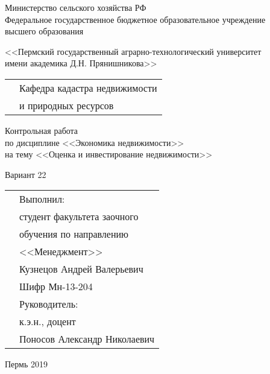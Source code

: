 \thispagestyle{empty}
\begin{center}
	Министерство сельского хозяйства РФ \\Федеральное государственное бюджетное образовательное учреждение\\ высшего образования
	\vspace{0.5ex}
	
	<<Пермский государственный аграрно-технологический университет\\ имени академика Д.Н. Прянишникова>>
\end{center}
\vspace{10ex}
\begin{tabularx}{\textwidth}{XX}
	& Кафедра кадастра недвижимости \\
	& и природных ресурсов
\end{tabularx}
\begin{center}
	\vspace{13ex}
	Контрольная работа\\
	по дисциплине <<Экономика недвижимости>> \\
	\vspace{1ex}
	на тему <<Оценка и инвестирование недвижимости>>
	\vspace{1ex}
	
	Вариант 22
\end{center}
	\vspace{8ex}
	\begin{tabularx}{\textwidth}{XX}
	& Выполнил:\\
	& студент факультета заочного \\
	& обучения по направлению \\
	& <<Менеджмент>> \\
	& Кузнецов Андрей Валерьевич \\
	& Шифр Мн-13-204\\
	& Руководитель:\\
	& к.э.н., доцент\\
	& Поносов Александр Николаевич\\
	\end{tabularx}
\begin{center}
	\vfill
	Пермь 2019
\end{center}

